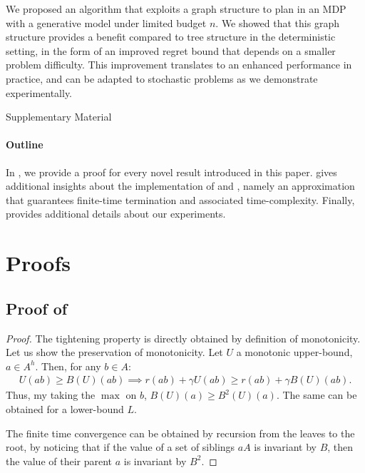 \documentclass[runningheads]{llncs}
\begin{document}
We proposed an algorithm that exploits a graph structure to plan in an MDP with a generative model under limited budget $n$. We showed that this graph structure provides a benefit compared to tree structure in the deterministic setting, in the form of an improved regret bound that depends on a smaller problem difficulty. This improvement translates to an enhanced performance in practice, and can be adapted to stochastic problems as we demonstrate experimentally.

\FloatBarrier




\appendix
\clearpage
\begin{center}
	\LARGE Supplementary Material
\end{center}

\paragraph{Outline}
In , we provide a proof for every novel result introduced in this paper.  gives additional insights about the implementation of \GBOPD and \GBOP, namely an approximation that guarantees finite-time termination and associated time-complexity. Finally,  provides additional details about our experiments.

\section{Proofs}
\label{sec:proof}

\subsection{Proof of }
\begin{proof}
The tightening property is directly obtained by definition of monotonicity.
Let us show the preservation of monotonicity. Let $U$ a monotonic upper-bound, $a\in A^h$. Then, for any $b\in A$:
\begin{align*}
U(ab) \geq B(U)(ab) \implies 
r(ab) + \gamma U(ab) \geq r(ab) + \gamma B(U)(ab).
\end{align*}
Thus, my taking the $\max$ on $b$,
$
B(U)(a) \geq B^2(U)(a).
$
The same can be obtained for a lower-bound $L$.

The finite time convergence can be obtained by recursion from the leaves to the root, by noticing that if the value of a set of siblings $aA$ is invariant by $B$, then the value of their parent $a$ is invariant by $B^2$.
\end{proof}
\end{document}
